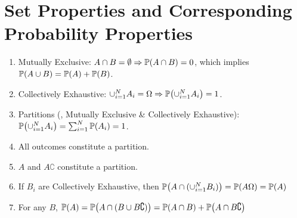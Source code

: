 \section{Set Properties and Corresponding Probability Properties}
\begin{enumerate}
    \item Mutually Exclusive: $A \cap B = \emptyset \Rightarrow \P{A \cap B}=0$, which implies $\P{A \cup B} = \P{A}+\P{B}$.
    \item Collectively Exhaustive: $\cup_{i=1}^{N}A_i = \Omega \Rightarrow \P{\cup_{i=1}^{N}A_i} = 1$.
    \item Partitions (\ie, Mutually Exclusive \& Collectively Exhaustive): $\P{\cup_{i=1}^N A_i}=\sum_{i=1}^{N}\P{A_i}=1$.
    \item All outcomes constitute a partition.
    \item $A$ and $A\complement$ constitute a partition.
    \item If $B_i$ are Collectively Exhaustive, then $\P{A\cap(\cup_{i=1}^N B_i)}=\P{A\Omega}=\P{A}$
    \item For any $B$, $\P{A}=\P{A\cap(B\cup B\complement)}=\P{A\cap B}+\P{A\cap B\complement}$
\end{enumerate}